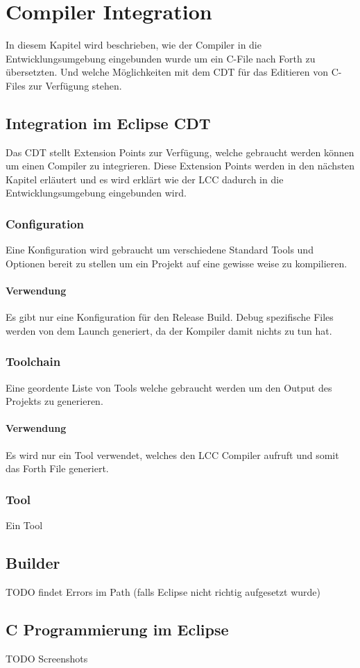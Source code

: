 \chapter{Compiler Integration}
\label{compilerintegration}

In diesem Kapitel wird beschrieben, wie der Compiler in die Entwicklungsumgebung eingebunden wurde um ein C-File nach Forth zu übersetzten. Und welche Möglichkeiten mit dem CDT für das Editieren von C-Files zur Verfügung stehen.

\section{Integration im Eclipse CDT}

Das CDT stellt Extension Points zur Verfügung, welche gebraucht werden können um einen Compiler zu integrieren. Diese Extension Points werden in den nächsten Kapitel erläutert und es wird erklärt wie der LCC dadurch in die Entwicklungsumgebung eingebunden wird.

\subsection{Configuration}

Eine Konfiguration wird gebraucht um verschiedene Standard Tools und Optionen bereit zu stellen um ein Projekt auf eine gewisse weise zu kompilieren. 

\subsubsection{Verwendung}
Es gibt nur eine Konfiguration für den Release Build. Debug spezifische Files werden von dem Launch generiert, da der Kompiler damit nichts zu tun hat.

\subsection{Toolchain}
Eine geordente Liste von Tools welche gebraucht werden um den Output des Projekts zu generieren. 

\subsubsection{Verwendung}
Es wird nur ein Tool verwendet, welches den LCC Compiler aufruft und somit das Forth File generiert.

\subsection{Tool}

Ein Tool

\section{Builder}

TODO findet Errors im Path (falls Eclipse nicht richtig aufgesetzt wurde)

\section{C Programmierung im Eclipse}

TODO Screenshots